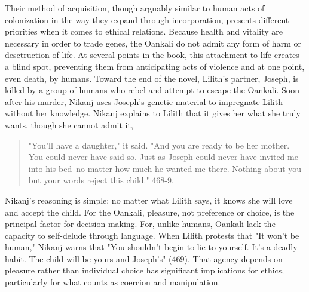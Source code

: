 \documentclass[11pt]{article}
\begin{document}
Their method of acquisition, though arguably similar to human acts of
colonization in the way they expand through incorporation, presents
different priorities when it comes to ethical relations. Because
health and vitality are necessary in order to trade genes, the Oankali
do not admit any form of harm or desctruction of life. At several
points in the book, this attachment to life creates a blind spot,
preventing them from anticipating acts of violence and at one point,
even death, by humans. Toward the end of the novel, Lilith's partner,
Joseph, is killed by a group of humans who rebel and attempt to escape
the Oankali. Soon after his murder, Nikanj uses Joseph's genetic
material to impregnate Lilith without her knowledge. Nikanj explains
to Lilith that it gives her what she truly wants, though she cannot
admit it,
\begin{quote}
"You'll have a daughter," it said. "And you are ready to be her
mother. You could never have said so. Just as Joseph could never have
invited me into his bed--no matter how much he wanted me
there. Nothing about you but your words reject this child." 468-9.
\end{quote}
Nikanj's reasoning is simple: no matter what Lilith says, it knows she
will love and accept the child. For the Oankali, pleasure, not
preference or choice, is the principal factor for
decision-making. For, unlike humans, Oankali lack the capacity to
self-delude through language. When Lilith protests that "It won't be
human," Nikanj warns that "You shouldn't begin to lie to
yourself. It's a deadly habit. The child will be yours and Joseph's"
(469). That agency depends on pleasure rather than individual choice
has significant implications for ethics, particularly for what counts
as coercion and manipulation.
\end{document}
